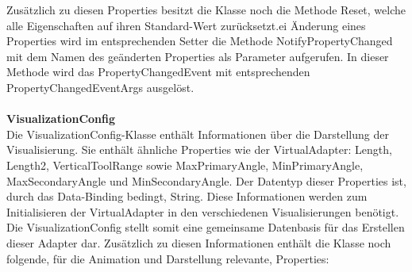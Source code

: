 Zusätzlich zu diesen Properties besitzt die Klasse noch die Methode Reset, welche alle Eigenschaften auf ihren Standard-Wert zurücksetzt.ei Änderung eines Properties wird im entsprechenden Setter die Methode NotifyPropertyChanged mit dem Namen des geänderten Properties als Parameter aufgerufen. In dieser Methode wird das PropertyChangedEvent mit entsprechenden PropertyChangedEventArgs ausgelöst.\\
\\
\textbf{VisualizationConfig}\\
Die VisualizationConfig-Klasse enthält Informationen über die Darstellung der Visualisierung. Sie enthält ähnliche Properties wie der VirtualAdapter: Length, Length2, VerticalToolRange sowie MaxPrimaryAngle, MinPrimaryAngle, MaxSecondaryAngle und MinSecondaryAngle. Der Datentyp dieser Properties ist, durch das Data-Binding bedingt, String. Diese Informationen werden zum Initialisieren der VirtualAdapter in den verschiedenen Visualisierungen benötigt. Die VisualizationConfig stellt somit eine gemeinsame Datenbasis für das Erstellen dieser Adapter dar.
Zusätzlich zu diesen Informationen enthält die Klasse noch folgende, für die Animation und Darstellung relevante, Properties:

